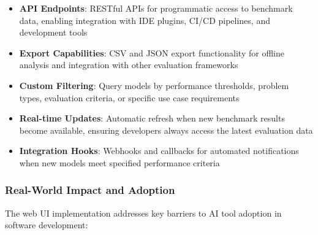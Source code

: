\documentclass[conference]{IEEEtran}
\begin{document}
\begin{itemize}
    \item \textbf{API Endpoints}: RESTful APIs for programmatic access to benchmark data, enabling integration with IDE plugins, CI/CD pipelines, and development tools
    \item \textbf{Export Capabilities}: CSV and JSON export functionality for offline analysis and integration with other evaluation frameworks
    \item \textbf{Custom Filtering}: Query models by performance thresholds, problem types, evaluation criteria, or specific use case requirements
    \item \textbf{Real-time Updates}: Automatic refresh when new benchmark results become available, ensuring developers always access the latest evaluation data
    \item \textbf{Integration Hooks}: Webhooks and callbacks for automated notifications when new models meet specified performance criteria
\end{itemize}






\subsubsection{Real-World Impact and Adoption}

The web UI implementation addresses key barriers to AI tool adoption in software development:
\end{document}
